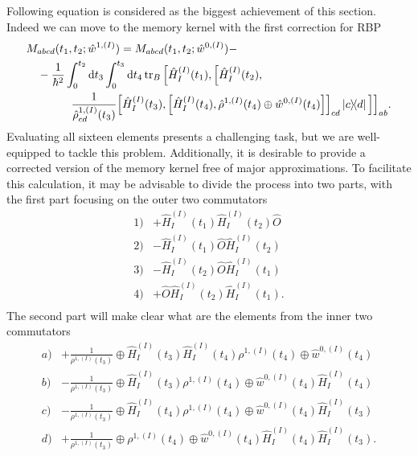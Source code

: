Following equation is considered as the biggest achievement of this section. Indeed we can move to the memory kernel with the first correction for RBP
\begin{equation}
    \begin{aligned}
    &M_{abcd}(t_1, t_2; \hat{w}^{1,(I)}) = M_{abcd}(t_1, t_2; \hat{w}^{0,(I)}) - \\
    &\quad -\frac{1}{\hbar^2} \int_{0}^{t_2} \mathrm{d} t_3 \int_{0}^{t_3} \mathrm{d} t_4 \operatorname{tr}_B \Big[ \hat{H}_{I}^{(I)}(t_1), \Big[\hat{H}_{I}^{(I)}(t_2), \\
    &\quad \quad \quad \quad  \frac{1}{\hat{\rho}^{1, (I)}_{cd}(t_3)}\Big[\hat{H}_{I}^{(I)}(t_3), \Big[\hat{H}_{I}^{(I)}(t_4), \hat{\rho}^{1, (I)}(t_4) \oplus \hat{w}^{0, (I)}(t_4) \Big]\Big]_{cd} \ketbra{c}{d} \Big]\Big]_{ab}.
    \end{aligned}
\end{equation}
Evaluating all sixteen elements presents a challenging task, but we are well-equipped to tackle this problem. Additionally, it is desirable to provide a corrected version of the memory kernel free of major approximations. To facilitate this calculation, it may be advisable to divide the process into two parts, with the first part focusing on the outer two commutators
\begin{equation}
\label{commutators_1234}
    \begin{array}{rl}
        1) & +\hat{H}_{I}^{(I)}(t_1) \hat{H}_{I}^{(I)}(t_2) \hat{O} \\
        2) & -\hat{H}_{I}^{(I)}(t_1) \hat{O}  \hat{H}_{I}^{(I)}(t_2) \\
        3) & - \hat{H}_{I}^{(I)}(t_2) \hat{O} \hat{H}_{I}^{(I)}(t_1) \\
        4) & + \hat{O} \hat{H}_{I}^{(I)}(t_2) \hat{H}_{I}^{(I)}(t_1). \\
    \end{array}
\end{equation}
The second part will make clear what are the elements from the inner two commutators
\begin{equation}
\label{commutators_abcd}
    \begin{array}{rl}
        a) & + \frac{1}{\rho^{1, (I)}(t_3)} \oplus \hat{H}_{I}^{(I)}(t_3) \hat{H}_{I}^{(I)}(t_4) \rho^{1, (I)}(t_4) \oplus \hat{w}^{0, (I)}(t_4) \\
        b) & - \frac{1}{\rho^{1, (I)}(t_3)} \oplus \hat{H}_{I}^{(I)}(t_3) \rho^{1, (I)}(t_4) \oplus \hat{w}^{0, (I)}(t_4) \hat{H}_{I}^{(I)}(t_4)  \\
        c) & - \frac{1}{\rho^{1, (I)}(t_3)} \oplus \hat{H}_{I}^{(I)}(t_4) \rho^{1, (I)}(t_4) \oplus \hat{w}^{0, (I)}(t_4) \hat{H}_{I}^{(I)}(t_3)  \\
        d) & + \frac{1}{\rho^{1, (I)}(t_3)} \oplus \rho^{1, (I)}(t_4) \oplus \hat{w}^{0, (I)}(t_4) \hat{H}_{I}^{(I)}(t_4)  \hat{H}_{I}^{(I)}(t_3). \\
    \end{array}
\end{equation}

